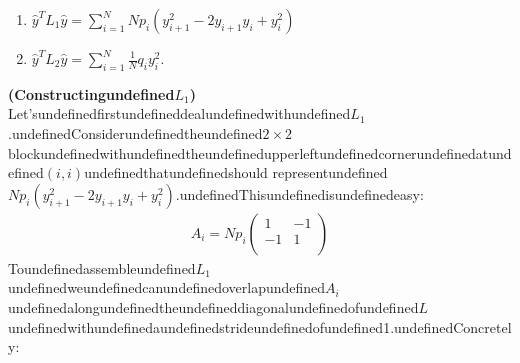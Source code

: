 \begin{enumerate}
\item $\hat y^T L_1 \hat y = \sum_{i=1}^N Np_i(y_{i+1}^2 -2y_{i+1}y_i +y_i^2)$
\item $\hat y^T L_2 \hat y = \sum_{i=1}^N \frac{1}{N}q_iy_i^2$.
\end{enumerate}

\textbf{(Constructingundefined$L_1$)}
Let'sundefinedfirstundefineddealundefinedwithundefined$L_1$.undefinedConsiderundefinedtheundefined$2\times 2$blockundefinedwithundefinedtheundefinedupperleftundefinedcornerundefinedatundefined$(i,i)$undefinedthatundefinedshould
representundefined$Np_i(y_{i+1}^2 -2y_{i+1}y_i +y_i^2)$.undefinedThisundefinedisundefinedeasy:
\begin{equation}
\begin{aligned}
A_i=Np_i\begin{pmatrix}
1 & -1\\
-1 & 1 \\
\end{pmatrix}
\end{aligned}
\end{equation}
Toundefinedassembleundefined$L_1$undefinedweundefinedcanundefinedoverlapundefined$A_i$undefinedalongundefinedtheundefineddiagonalundefinedofundefined$L$undefinedwithundefinedaundefinedstrideundefinedofundefined1.undefinedConcretely:


